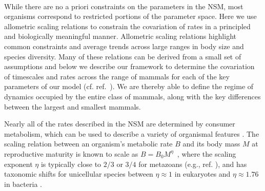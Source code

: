 \documentclass{pnastwo}
\begin{document}
\begin{article}
 \\
While there are no a priori constraints on the parameters in the NSM, most
organisms correspond to restricted portions of the parameter space.  Here we
use allometric scaling relations to constrain the covariation of rates in a
principled and biologically meaningful manner.  Allometric scaling relations
highlight common constraints and average trends across large ranges in body
size and species diversity. Many of these relations can be derived from a
small set of assumptions and below we describe our framework to determine the
covariation of timescales and rates across the range of mammals for each of
the key parameters of our model (cf. ref.~\cite{Yodzis:1992hg}).  We are thereby
able to define the regime of dynamics occupied by the entire class of mammals, along with the key differences between the largest and smallest mammals.


Nearly all of the rates described in the NSM are determined by consumer
metabolism, which can be used to describe a variety of organismal features
\cite{Brown:2004wq}.  The scaling relation between an organism's metabolic
rate $B$ and its body mass $M$ at reproductive maturity is known to scale as
$B = B_0 M^\eta$~\cite{West:2002it}, where the scaling exponent $\eta$ is
typically close to $2/3$ or $3/4$ for metazoans (e.g., ref. \cite{Brown:2004wq}),
and has taxonomic shifts for unicellular species between $\eta\approx 1$ in
eukaryotes and $\eta\approx 1.76$ in bacteria
\cite{DeLong:2010dy,Kempes:2012hy}.


\end{article}
\end{document}
